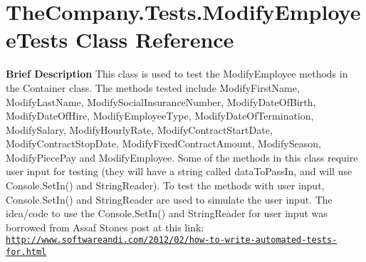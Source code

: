 \hypertarget{class_the_company_1_1_tests_1_1_modify_employee_tests}{}\section{The\+Company.\+Tests.\+Modify\+Employee\+Tests Class Reference}
\label{class_the_company_1_1_tests_1_1_modify_employee_tests}


{\bfseries  Brief Description} This class is used to test the Modify\+Employee methods in the Container class. The methods tested include Modify\+First\+Name, Modify\+Last\+Name, Modify\+Social\+Insurance\+Number, Modify\+Date\+Of\+Birth, Modify\+Date\+Of\+Hire, Modify\+Employee\+Type, Modify\+Date\+Of\+Termination, Modify\+Salary, Modify\+Hourly\+Rate, Modify\+Contract\+Start\+Date, Modify\+Contract\+Stop\+Date, Modify\+Fixed\+Contract\+Amount, Modify\+Season, Modify\+Piece\+Pay and Modify\+Employee. Some of the methods in this class require user input for testing (they will have a string called data\+To\+Pass\+In, and will use Console.\+Set\+In() and String\+Reader). To test the methods with user input, Console.\+Set\+In() and String\+Reader are used to simulate the user input. The idea/code to use the Console.\+Set\+In() and String\+Reader for user input was borrowed from Assaf Stone\textquotesingle{}s post at this link\+: \href{http://www.softwareandi.com/2012/02/how-to-write-automated-tests-for.html}{\tt http\+://www.\+softwareandi.\+com/2012/02/how-\/to-\/write-\/automated-\/tests-\/for.\+html}  


